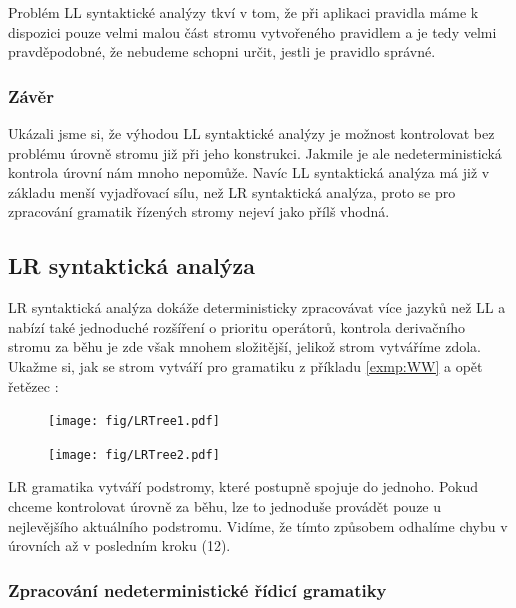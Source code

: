 Problém LL syntaktické analýzy tkví v tom, že při aplikaci pravidla máme k
dispozici pouze velmi malou část stromu vytvořeného pravidlem a je tedy velmi
pravděpodobné, že nebudeme schopni určit, jestli je pravidlo správné.\\

\subsubsection*{Závěr}

Ukázali jsme si, že výhodou LL syntaktické analýzy je možnost kontrolovat
bez problému úrovně stromu již při jeho konstrukci.
Jakmile je ale  nedeterministická kontrola úrovní
nám mnoho nepomůže.
Navíc LL syntaktická analýza má již v základu menší vyjadřovací sílu, než
LR syntaktická analýza, proto se pro zpracování gramatik řízených stromy
nejeví jako přílš vhodná.

\subsection{LR syntaktická analýza}
\label{subsection:LR}
LR syntaktická analýza dokáže deterministicky zpracovávat více jazyků
než LL a nabízí také jednoduché rozšíření o prioritu operátorů,
kontrola derivačního stromu za běhu je zde však mnohem složitější,
jelikož strom vytváříme zdola. Ukažme si, jak se strom vytváří pro
gramatiku z příkladu \ref{exmp:WW} a opět řetězec :

\begin{figure}[H]
  \centering
  \texttt{[image: fig/LRTree1.pdf]}
\end{figure}

\begin{figure}[H]
  \centering
  \texttt{[image: fig/LRTree2.pdf]}
\end{figure}

LR gramatika vytváří podstromy, které postupně spojuje do jednoho.
Pokud chceme kontrolovat úrovně za běhu, lze to jednoduše provádět pouze
u nejlevějšího aktuálního podstromu.
Vidíme, že tímto způsobem odhalíme chybu v úrovních až v posledním kroku (12).\\

\subsubsection{Zpracování nedeterministické řídicí gramatiky}

